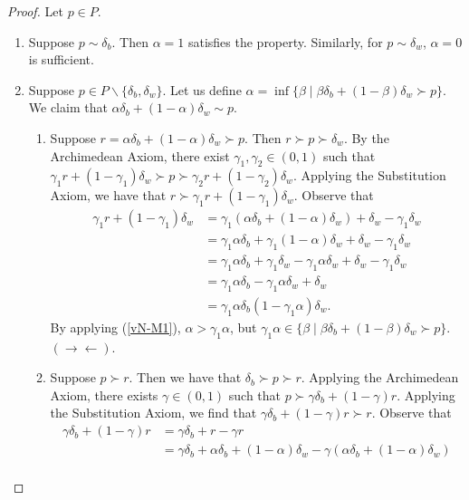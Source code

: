 \documentclass[12pt]{article}
\theoremstyle{definition}
\theoremstyle{remark}
\def\contra{\rightarrow \leftarrow}
\begin{document}
\begin{proof}
  Let $p \in P$.
  \begin{enumerate}
    \item Suppose $p \sim \delta_b$. Then $\alpha = 1$ satisfies the property. Similarly, for $p \sim \delta_w$, $\alpha = 0$ is sufficient.
    \item Suppose $p \in P \backslash \{ \delta_b, \delta_w \}$. Let us define $\alpha = \inf \{ \beta \mid \beta \delta_b + (1 - \beta) \delta_w \succ p \}$. We claim that $\alpha \delta_b + (1 - \alpha)\delta_w \sim p$.
    \begin{enumerate}
      \item Suppose $r = \alpha \delta_b + (1 - \alpha)\delta_w \succ p$. Then $r \succ p \succ \delta_w$. By the Archimedean Axiom, there exist $\gamma_1, \gamma_2 \in (0,1)$ such that $\gamma_1 r + (1 - \gamma_1) \delta_w \succ p \succ \gamma_2 r + (1 - \gamma_2) \delta_w$.
      Applying the Substitution Axiom, we have that $r \succ \gamma_1 r + (1 - \gamma_1) \delta_w$. Observe that
      \begin{align*}
        \gamma_1 r + (1 - \gamma_1) \delta_w &= \gamma_1 (\alpha \delta_b + (1 - \alpha)\delta_w) + \delta_w - \gamma_1 \delta_w \\
        &= \gamma_1 \alpha \delta_b + \gamma_1 (1 - \alpha)\delta_w + \delta_w - \gamma_1 \delta_w \\
        &= \gamma_1 \alpha \delta_b + \gamma_1 \delta_w - \gamma_1 \alpha \delta_w + \delta_w - \gamma_1 \delta_w \\
        &= \gamma_1 \alpha \delta_b - \gamma_1 \alpha \delta_w + \delta_w \\
        &= \gamma_1 \alpha \delta_b (1 - \gamma_1 \alpha)\delta_w.
      \end{align*}
      By applying (\ref{vN-M1}), $\alpha > \gamma_1 \alpha$, but $\gamma_1 \alpha \in \{ \beta \mid \beta \delta_b + (1 - \beta) \delta_w \succ p \}$. $(\contra)$.
      \item Suppose $p \succ r$. Then we have that $\delta_b \succ p \succ r$. Applying the Archimedean Axiom, there exists $\gamma \in (0,1)$ such that $p \succ \gamma \delta_b + (1 - \gamma) r$. Applying the Substitution Axiom, we find that $\gamma \delta_b + (1 - \gamma) r \succ r$. Observe that
      \begin{align*}
        \gamma \delta_b + (1 - \gamma) r &= \gamma \delta_b + r - \gamma r \\
        &= \gamma \delta_b + \alpha \delta_b + (1 - \alpha) \delta_w - \gamma (\alpha \delta_b + (1 - \alpha) \delta_w) \\

\end{align*}
\end{enumerate}
\end{enumerate}
\end{proof}
\end{document}
